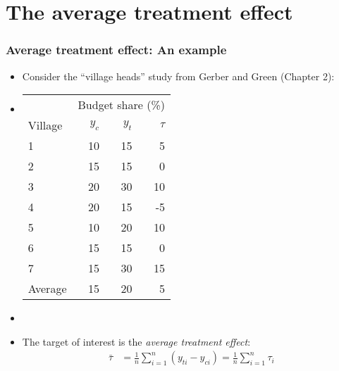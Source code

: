 \documentclass[table, xcolor={dvipsnames}, 9pt]{beamer}
\theoremstyle{newstyle}
\begin{document}
\section{The average treatment effect}
\begin{frame}
\frametitle{Average treatment effect: An example} 

\begin{itemize}
\item Consider the ``village heads'' study from Gerber and Green (Chapter 2): 
\item[]
\begin{center}
\begin{tabular}{l|rrr} \hline
& \multicolumn{3}{c}{Budget share (\%)} \\
Village &$y_{c}$& $y_{t}$& $\tau$  \\ \hline
1& 10 & 15  & 5  \\
2& 15 & 15  & 0   \\ 
3& 20 & 30  & 10   \\
4& 20 & 15  & -5   \\
5& 10 & 20  & 10   \\
6& 15 & 15  & 0   \\
7& 15 & 30  & 15   \\ \hline
Average & 15 & 20 & 5  \\ \hline
\end{tabular}
\end{center}
\item[]
\item The target of interest is the \textit{average treatment effect}:
\begin{align*}
\bar{\tau} & = \frac{1}{n}\sum \limits_{i = 1}^{n} \left(y_{ti} - y_{ci}\right) = \frac{1}{n}\sum \limits_{i = 1}^{n} \tau_i
\end{align*}
\end{itemize}
\end{frame}
\end{document}
